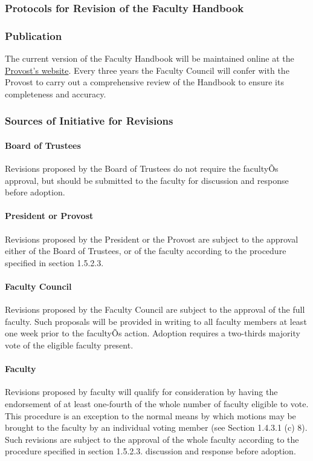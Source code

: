 \documentclass[letterpaper, 11pt]{article}
\begin{document}
		\subsubsection{Protocols for Revision of the Faculty Handbook}
		\subsubsection{Publication}
			The current version of the Faculty Handbook will be maintained online at the \href{http://www.westmont.edu/_offices/provost/documents/Faculty-Handbook.pdf}{Provost's website}.  Every three years the Faculty Council will confer with the Provost to carry out a comprehensive review of the Handbook to ensure its completeness and accuracy.
		\subsubsection{Sources of Initiative for Revisions}
			\paragraph{Board of Trustees}
				Revisions proposed by the Board of Trustees do not require the facultyÕs approval, but should be submitted to the faculty for discussion and response before adoption.
			\paragraph{President or Provost}
				Revisions proposed by the President or the Provost are subject to the approval either of the Board of Trustees, or of the faculty according to the procedure specified in section 1.5.2.3.
			\paragraph{Faculty Council}
				Revisions proposed by the Faculty Council are subject to the approval of the full faculty. Such proposals will be provided in writing to all faculty members at least one week prior to the facultyÕs action. Adoption requires a two-thirds majority vote of the eligible faculty present.
			\paragraph{Faculty}
				Revisions proposed by faculty will qualify for consideration by having the endorsement of at least one-fourth of the whole number of faculty eligible to vote. This procedure is an exception to the normal means by which motions may be brought to the faculty by an individual voting member (see Section 1.4.3.1 (c) 8).  Such revisions are subject to the approval of the whole faculty according to the procedure specified in section 1.5.2.3.
				discussion and response before adoption.
\end{document}
